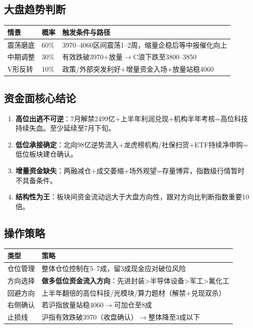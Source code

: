 \documentclass[a4paper,11pt,fontset=none]{ctexart}
\begin{document}
\subsection*{大盘趋势判断}

\begin{tabularx}{\textwidth}{L{2cm}L{1.5cm}X}
\toprule
\textbf{情景} & \textbf{概率} & \textbf{触发条件与路径} \\
\midrule
震荡磨底 & 60\% & 3970--4060区间震荡1--2周，缩量企稳后等中报催化向上 \\
中期调整 & 30\% & 有效跌破3970+放量$\to$C浪下跌至3800--3850 \\
V形反转 & 10\% & 政策/外部突发利好+增量资金入场+放量站稳4060 \\
\bottomrule
\end{tabularx}

\subsection*{资金面核心结论}

\begin{enumerate}
  \item \textbf{高位出逃不可逆}：7月解禁2499亿+上半年利润兑现+机构半年考核=高位科技持续失血。至少延续至7月下旬。
  \item \textbf{低位承接确定}：北向98亿逆势流入+龙虎榜机构/社保扫货+ETF持续净申购=低位板块建仓确认。
  \item \textbf{增量资金缺失}：两融减仓+成交萎缩+场外观望=存量博弈，指数级行情暂时不具备条件。
  \item \textbf{结构性为王}：板块间资金流动远大于大盘方向性，跟对方向比判断指数重要10倍。
\end{enumerate}

\subsection*{操作策略}

\begin{tabularx}{\textwidth}{L{3cm}X}
\toprule
\textbf{类型} & \textbf{策略} \\
\midrule
仓位管理 & 整体仓位控制在5--7成，留3成现金应对破位风险 \\
方向选择 & \textbf{做多低位资金流入方向}：先进封装>半导体设备>军工>氟化工 \\
回避方向 & 上半年翻倍的高位科技/光模块/算力题材（解禁+兑现双杀） \\
右侧确认 & 若沪指放量站稳4060$\to$可加仓至8成 \\
止损线 & 沪指有效跌破3970（收盘确认）$\to$整体降至3成以下 \\
\bottomrule
\end{tabularx}
\end{document}
